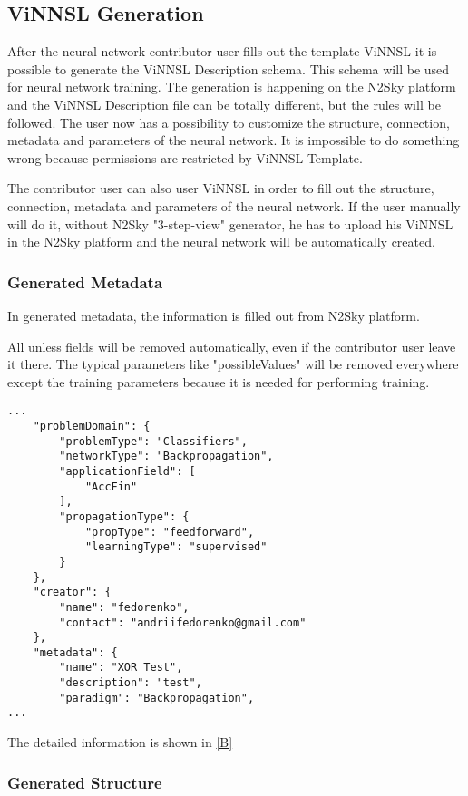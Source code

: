 \subsection{ViNNSL Generation}\label{ViNNSL Generation}

After the neural network contributor user fills out the template ViNNSL it is possible to generate the ViNNSL Description schema. This schema will be used for neural network training. The generation is happening  on the N2Sky platform and the ViNNSL Description file can be totally different, but the rules will be followed. The user now has a possibility to customize the structure, connection, metadata and parameters of the neural network. It is impossible to do something wrong because permissions are restricted by ViNNSL Template. 

The contributor user can also user ViNNSL in order to fill out the structure, connection, metadata and parameters of the neural network. If the user manually will do it, without N2Sky "3-step-view" generator, he has to upload his ViNNSL in the N2Sky platform and the neural network will be automatically created. 

\subsubsection{Generated Metadata}\label{Generated metadata}

In generated metadata, the information is filled out from N2Sky platform.

All unless fields will be removed automatically, even if the contributor user leave it there. The typical parameters like "possibleValues" will be removed everywhere except the training parameters because it is needed for performing training.

 \begin{lstlisting}[caption=Generated ViNNSL model]
 ...
	"problemDomain": {
		"problemType": "Classifiers",
		"networkType": "Backpropagation",
		"applicationField": [
			"AccFin"
		],
		"propagationType": {
			"propType": "feedforward",
			"learningType": "supervised"
		}
	},
	"creator": {
		"name": "fedorenko",
		"contact": "andriifedorenko@gmail.com"
	},
	"metadata": {
		"name": "XOR Test",
		"description": "test",
		"paradigm": "Backpropagation",
...
\end{lstlisting}

The detailed information is shown in \autoref{B}

\subsubsection{Generated Structure}\label{Generated structure}

